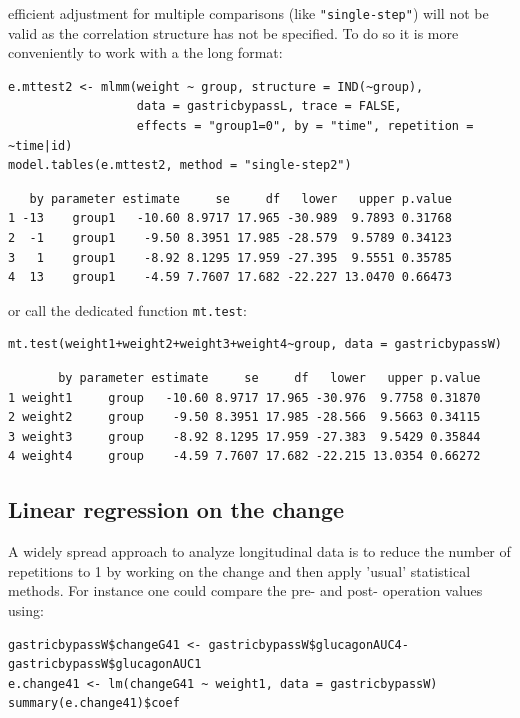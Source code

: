 \documentclass[12pt]{article}
\newcommand\Warning[1][3ex]{%
\renewcommand\stacktype{L}%
\scaleto{\stackon[1.3pt]{\color{red}$\triangle$}{\tiny\bfseries !}}{#1}%
\xspace
}
\begin{document}
\Warning efficient adjustment for multiple comparisons (like
\texttt{"single-step"}) will not be valid as the correlation structure has
not be specified. To do so it is more conveniently to work with a the
long format:
\lstset{language=r,label= ,caption= ,captionpos=b,numbers=none}
\begin{lstlisting}
e.mttest2 <- mlmm(weight ~ group, structure = IND(~group),
                  data = gastricbypassL, trace = FALSE,
                  effects = "group1=0", by = "time", repetition = ~time|id)
model.tables(e.mttest2, method = "single-step2")
\end{lstlisting}

\begin{verbatim}
   by parameter estimate     se     df   lower   upper p.value
1 -13    group1   -10.60 8.9717 17.965 -30.989  9.7893 0.31768
2  -1    group1    -9.50 8.3951 17.985 -28.579  9.5789 0.34123
3   1    group1    -8.92 8.1295 17.959 -27.395  9.5551 0.35785
4  13    group1    -4.59 7.7607 17.682 -22.227 13.0470 0.66473
\end{verbatim}


or call the dedicated function \texttt{mt.test}:
\lstset{language=r,label= ,caption= ,captionpos=b,numbers=none}
\begin{lstlisting}
mt.test(weight1+weight2+weight3+weight4~group, data = gastricbypassW)
\end{lstlisting}

\begin{verbatim}
       by parameter estimate     se     df   lower   upper p.value
1 weight1     group   -10.60 8.9717 17.965 -30.976  9.7758 0.31870
2 weight2     group    -9.50 8.3951 17.985 -28.566  9.5663 0.34115
3 weight3     group    -8.92 8.1295 17.959 -27.383  9.5429 0.35844
4 weight4     group    -4.59 7.7607 17.682 -22.215 13.0354 0.66272
\end{verbatim}


\clearpage

\subsection{Linear regression on the change}
\label{sec:org81daef8}

A widely spread approach to analyze longitudinal data is to reduce the
number of repetitions to 1 by working on the change and then apply
'usual' statistical methods. For instance one could compare the pre-
and post- operation values using:

\lstset{language=r,label= ,caption= ,captionpos=b,numbers=none}
\begin{lstlisting}
gastricbypassW$changeG41 <- gastricbypassW$glucagonAUC4-gastricbypassW$glucagonAUC1
e.change41 <- lm(changeG41 ~ weight1, data = gastricbypassW)
summary(e.change41)$coef
\end{lstlisting}
\end{document}
